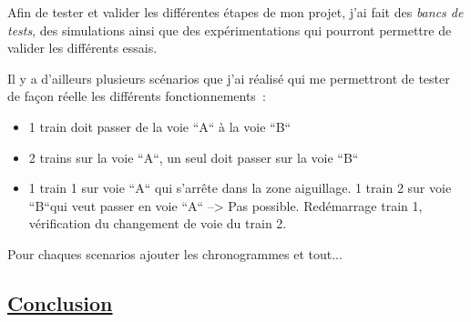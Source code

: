 Afin de tester et valider les diff\'erentes \'etapes de mon projet, j'ai
fait des \emph{bancs de tests}, des simulations ainsi que des
exp\'erimentations qui pourront permettre de valider les différents essais.

Il y a d'ailleurs plusieurs sc\'enarios que j'ai r\'ealisé qui
me permettront de tester de façon r\'eelle les différents fonctionnements~:


\begin{itemize}
    \item 1 train doit passer de la voie ``A`` à la voie ``B``
    \item 2 trains sur la voie ``A``, un seul doit passer sur la voie ``B``
    \item 1 train 1 sur voie ``A`` qui s'arrête dans la zone aiguillage.
          1 train 2 sur voie ``B``qui veut passer en voie ``A`` --> Pas
          possible. Red\'emarrage train 1, v\'erification du
          changement  de voie du train 2.
\end{itemize}


Pour chaques scenarios ajouter les chronogrammes et tout...

\subsection{\underline{Conclusion}}
\label{sec:Conclusion}


\newpage





